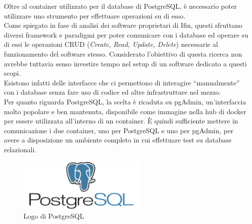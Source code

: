 \noindent Oltre al container utilizzato per il database di PostgreSQL, è necessario poter utilizzare uno strumento per effettuare operazioni su di esso.\\
Come spiegato in fase di analisi dei software proprietari di Ifin, questi sfruttano diversi framework e paradigmi per poter comunicare con i database ed operare su di essi le \gls{operazioni CRUD} (\textit{Create, Read, Update, Delete}) necessarie al funzionamento del software stesso. Considerato l'obiettivo di questa ricerca non avrebbe tuttavia senso investire tempo nel setup di un software dedicato a questi scopi.\\
Esistono infatti delle interfacce che ci permettono di interagire ``manualmente'' con i database senza fare uso di codice ed altre infrastrutture nel mezzo.\\
Per quanto riguarda PostgreSQL, la scelta è ricaduta su pgAdmin, un'interfaccia molto popolare e ben mantenuta, disponibile come immagine nella hub di docker per essere utilizzata all'interno di un container. È quindi sufficiente mettere in comunicazione i due container, uno per PostgreSQL e uno per pgAdmin, per avere a disposizione un ambiente completo in cui effettuare test su database relazionali.

\begin{figure}[htbp]
\begin{center}
\includegraphics[height=7em]{immagini/tecnologies-logos/postgresql-logo.png}
\caption{Logo di PostgreSQL}
\label{fig:postgresql}
\end{center}
\end{figure}

